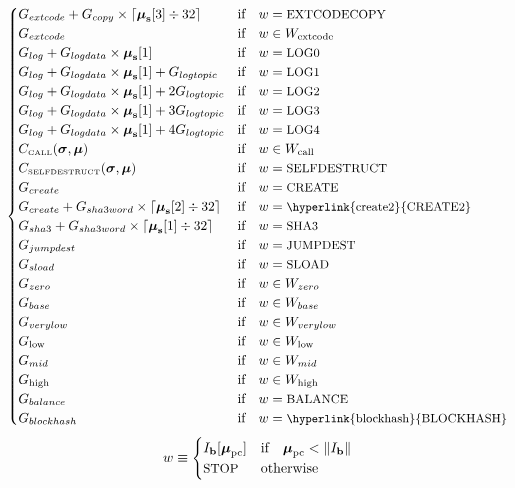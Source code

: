 \documentclass[9pt,oneside]{amsart}
\begin{document}
\begin{equation}
\begin{cases}
G_{extcode} + G_{copy}\times\lceil\boldsymbol{\mu}_{\mathbf{s}}[3] \div 32\rceil & \text{if} \quad w = \text{\small EXTCODECOPY} \\
G_{extcode} & \text{if} \quad w \in W_{\mathrm{extcode}}\\
G_{log}+G_{logdata}\times\boldsymbol{\mu}_{\mathbf{s}}[1] & \text{if} \quad w = \text{\small LOG0} \\
G_{log}+G_{logdata}\times\boldsymbol{\mu}_{\mathbf{s}}[1]+G_{logtopic} & \text{if} \quad w = \text{\small LOG1} \\
G_{log}+G_{logdata}\times\boldsymbol{\mu}_{\mathbf{s}}[1]+2G_{logtopic} & \text{if} \quad w = \text{\small LOG2} \\
G_{log}+G_{logdata}\times\boldsymbol{\mu}_{\mathbf{s}}[1]+3G_{logtopic} & \text{if} \quad w = \text{\small LOG3} \\
G_{log}+G_{logdata}\times\boldsymbol{\mu}_{\mathbf{s}}[1]+4G_{logtopic} & \text{if} \quad w = \text{\small LOG4} \\
C_\text{\tiny CALL}(\boldsymbol{\sigma}, \boldsymbol{\mu}) & \text{if} \quad w \in W_{\mathrm{call}} \\
C_\text{\tiny SELFDESTRUCT}(\boldsymbol{\sigma}, \boldsymbol{\mu}) & \text{if} \quad w = \text{\small SELFDESTRUCT} \\
G_{create} & \text{if} \quad w = \text{\small CREATE}\\
G_{create}+G_{sha3word} \times \lceil \boldsymbol{\mu}_{\mathbf{s}}[2] \div 32 \rceil & \text{if} \quad w = \text{\small \hyperlink{create2}{CREATE2}}\\
G_{sha3}+G_{sha3word} \times \lceil \boldsymbol{\mu}_{\mathbf{s}}[1] \div 32 \rceil & \text{if} \quad w = \text{\small SHA3}\\
G_{jumpdest} & \text{if} \quad w = \text{\small JUMPDEST}\\
G_{sload} & \text{if} \quad w = \text{\small SLOAD}\\
G_{zero} & \text{if} \quad w \in W_{zero}\\
G_{base} & \text{if} \quad w \in W_{base}\\
G_{verylow} & \text{if} \quad w \in W_{verylow}\\
G_{\mathrm{low}} & \text{if} \quad w \in W_{\mathrm{low}}\\
G_{mid} & \text{if} \quad w \in W_{mid}\\
G_{\mathrm{high}} & \text{if} \quad w \in W_{\mathrm{high}}\\
G_{balance} & \text{if} \quad w = \text{\small BALANCE}\\
G_{blockhash} & \text{if} \quad w = \text{\small \hyperlink{blockhash}{BLOCKHASH}}\\
\end{cases}
\end{equation}
\begin{equation}
w \equiv \begin{cases} I_{\mathbf{b}}[\boldsymbol{\mu}_{\mathrm{pc}}] & \text{if} \quad \boldsymbol{\mu}_{\mathrm{pc}} < \lVert I_{\mathbf{b}} \rVert\\
\text{\small STOP} & \text{otherwise}
\end{cases}
\end{equation}
\end{document}
